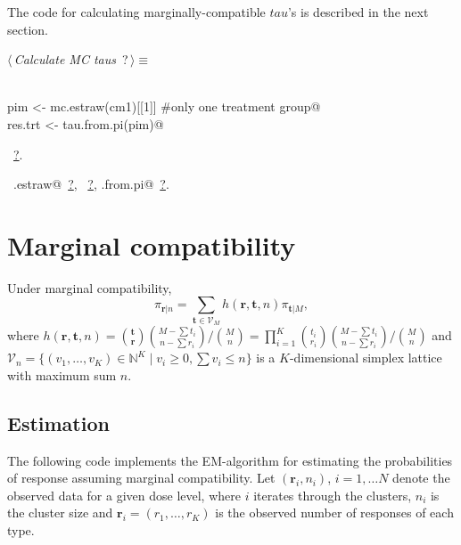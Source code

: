 \documentclass[reqno]{amsart}
\renewcommand{\NWtarget}[2]{\hypertarget{#1}{#2}}
\renewcommand{\NWlink}[2]{\hyperlink{#1}{#2}}
\newcommand{\rvec}{\mathbf{r}}
\newcommand{\tvec}{\mathbf{t}}
\newcommand{\V}{\mathcal{V}}
\begin{document}
The code for calculating marginally-compatible $tau$'s is described in the next section.

\begin{flushleft} \small\label{scrap18}\raggedright\small
\NWtarget{nuweb?}{} $\langle\,${\itshape Calculate MC taus}\nobreak\ {\footnotesize {?}}$\,\rangle\equiv$
\vspace{-1ex}
\begin{list}{}{} \item
\mbox{}\verb@@\\
\mbox{}\verb@   pim <- mc.estraw(cm1)[[1]]  #only one treatment group@\\
\mbox{}\verb@   res.trt <- tau.from.pi(pim)@\\
\mbox{}\verb@@{\NWsep}
\end{list}
\vspace{-1.5ex}
\footnotesize
\begin{list}{}{\setlength{\itemsep}{-\parsep}\setlength{\itemindent}{-\leftmargin}}
\item \NWtxtMacroRefIn\ \NWlink{nuweb?}{?}.
\item \NWtxtIdentsUsed\nobreak\  \verb@mc.estraw@\nobreak\ \NWlink{nuweb?}{?}, \verb@tau@\nobreak\ \NWlink{nuweb?}{?}, \verb@tau.from.pi@\nobreak\ \NWlink{nuweb?}{?}.
\item{}
\end{list}
\vspace{4ex}
\end{flushleft}
\section{Marginal compatibility}

Under marginal compatibility,
\begin{equation}
\pi_{\rvec|n} = \sum_{\tvec \in \V_M} h(\rvec, \tvec, n) \pi_{\tvec|M},
\end{equation}
where $h(\rvec, \tvec, n)  = \binom{\tvec}{\rvec}\binom{M-\sum t_i}{n-\sum r_i} \big/ \binom{M}{n} = 
\prod_{i=1}^K \binom{t_i}{r_i}\binom{M-\sum t_i}{n-\sum r_i} \big/ \binom{M}{n}$ and
$\V_n=\{(v_1,\ldots,v_K)\in \mathbb{N}^K \mid v_i \geq 0, \sum v_i \leq n\}$ is a $K$-dimensional simplex lattice with maximum
sum $n$.

\subsection{Estimation}

The following code implements the EM-algorithm for estimating the probabilities
of response assuming marginal compatibility. Let $(\rvec_i, n_i)$, $i=1,\ldots N$ denote
the observed data for a given dose level, where $i$ iterates
through the clusters, $n_i$ is the cluster size and 
$\rvec_i = (r_1,\ldots,r_K)$ is the observed number of responses of each type.
\end{document}
